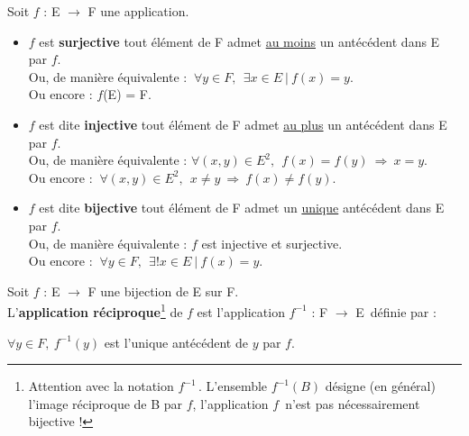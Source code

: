 \vspace{1cm}

Soit \(f\) : E \(\to\) F une application.\vspace{-0.2cm}
\begin{itemize}[leftmargin=0cm, label=•]
    \item \(f\) est \textbf{surjective} \ssi tout élément de F admet \underline{au moins} un antécédent dans E par \(f\). \\
    Ou, de manière équivalente : \( \ \forall y\in  F,\ \ \exists x\in E \ |\ f(x)=y. \) \\
    Ou encore : \(f\)(E) = F.\vspace{0.3cm}
    
    \item \(f\) est dite \textbf{injective} \ssi tout élément de F admet \underline{au plus} un antécédent dans E par \(f\).\\
    Ou, de manière équivalente :  \( \forall (x,y)\in E^2, \ \ f(x)=f(y)\ \Rightarrow \ x=y \). \\
    Ou encore : \( \ \forall (x,y)\in E^2, \ \ x\neq y\ \Rightarrow \ f(x)\neq f(y).\)\vspace{0.3cm}
    
    \item \(f\) est dite \textbf{bijective} \ssi tout élément de F admet un \underline{unique} antécédent dans E par \(f\). \\
    Ou, de manière équivalente : \(f\) est injective et surjective. \\
    Ou encore : \( \ \forall y\in F, \ \ \exists !x\in E \ | \ f(x)=y.\)
\end{itemize}

\vspace{1cm}

Soit \(f\) : E \(\to\) F une bijection de E sur F.\\
L'\textbf{application réciproque}\footnote{Attention avec la notation $f^{-1}\,$. L'ensemble \(f^{-1}(B)\) désigne (en général) l'image réciproque de B par $f$, l'application $f\,$ n'est pas nécessairement bijective !} de \(f\) est l'application \(f^{-1}\) : F \(\to\) E\, définie par :\vspace{-0.15cm}
\begin{center}
    \( \forall y\in F,\ f^{-1}(y)\) est l'unique antécédent de \(y\) par \(f\).    
\end{center}

